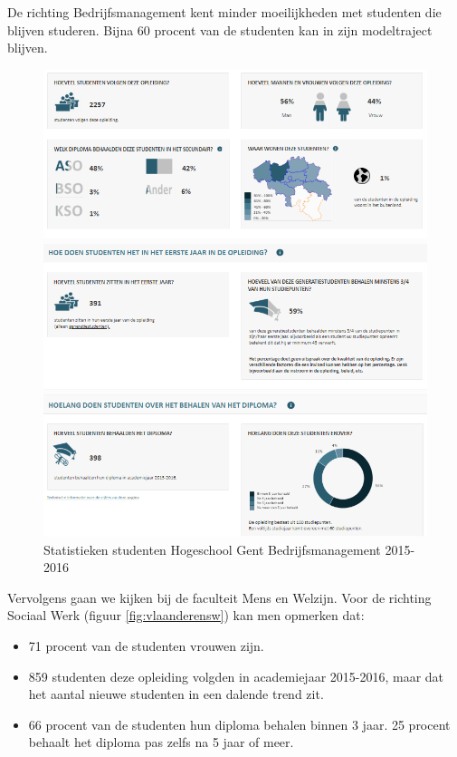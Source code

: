 De richting Bedrijfsmanagement kent minder moeilijkheden met studenten die blijven studeren. Bijna 60 procent van de studenten kan in zijn modeltraject blijven.

\begin{figure}
	\includegraphics[width=\textwidth]
	{img/vlaanderen_bm.png}
	\caption{Statistieken studenten Hogeschool Gent Bedrijfsmanagement 2015-2016
		\autocite{Onderwijs.vlaanderen.be2017}}
	\label{fig:vlaanderenbm}
\end{figure}

Vervolgens gaan we kijken bij de faculteit Mens en Welzijn. Voor de richting Sociaal Werk (figuur \ref{fig:vlaanderensw}) kan men opmerken dat:
\begin{itemize}
	\item 71 procent van de studenten vrouwen zijn.
	\item 859 studenten deze opleiding volgden in academiejaar 2015-2016, maar dat het aantal nieuwe studenten in een dalende trend zit.
	\item 66 procent van de studenten hun diploma behalen binnen 3 jaar. 25 procent behaalt het diploma pas zelfs na 5 jaar of meer.
\end{itemize}

